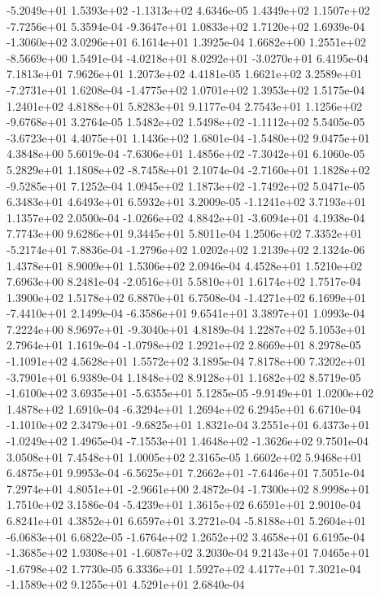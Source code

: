-5.2049e+01  1.5393e+02 -1.1313e+02  4.6346e-05
 1.4349e+02  1.1507e+02 -7.7256e+01  5.3594e-04
-9.3647e+01  1.0833e+02  1.7120e+02  1.6939e-04
-1.3060e+02  3.0296e+01  6.1614e+01  1.3925e-04
 1.6682e+00  1.2551e+02 -8.5669e+00  1.5491e-04
-4.0218e+01  8.0292e+01 -3.0270e+01  6.4195e-04
7.1813e+01 7.9626e+01 1.2073e+02  4.4181e-05
 1.6621e+02  3.2589e+01 -7.2731e+01  1.6208e-04
-1.4775e+02  1.0701e+02  1.3953e+02  1.5175e-04
1.2401e+02 4.8188e+01 5.8283e+01  9.1177e-04
 2.7543e+01  1.1256e+02 -9.6768e+01  3.2764e-05
 1.5482e+02  1.5498e+02 -1.1112e+02  5.5405e-05
-3.6723e+01  4.4075e+01  1.1436e+02  1.6801e-04
-1.5480e+02  9.0475e+01  4.3848e+00  5.6019e-04
-7.6306e+01  1.4856e+02 -7.3042e+01  6.1060e-05
 5.2829e+01  1.1808e+02 -8.7458e+01  2.1074e-04
-2.7160e+01  1.1828e+02 -9.5285e+01  7.1252e-04
 1.0945e+02  1.1873e+02 -1.7492e+02  5.0471e-05
6.3483e+01 4.6493e+01 6.5932e+01  3.2009e-05
-1.1241e+02  3.7193e+01  1.1357e+02  2.0500e-04
-1.0266e+02  4.8842e+01 -3.6094e+01  4.1938e-04
7.7743e+00 9.6286e+01 9.3445e+01  5.8011e-04
 1.2506e+02  7.3352e+01 -5.2174e+01  7.8836e-04
-1.2796e+02  1.0202e+02  1.2139e+02  2.1324e-06
1.4378e+01 8.9009e+01 1.5306e+02  2.0946e-04
4.4528e+01 1.5210e+02 7.6963e+00  8.2481e-04
-2.0516e+01  5.5810e+01  1.6174e+02  1.7517e-04
1.3900e+02 1.5178e+02 6.8870e+01  6.7508e-04
-1.4271e+02  6.1699e+01 -7.4410e+01  2.1499e-04
-6.3586e+01  9.6541e+01  3.3897e+01  1.0993e-04
 7.2224e+00  8.9697e+01 -9.3040e+01  4.8189e-04
1.2287e+02 5.1053e+01 2.7964e+01  1.1619e-04
-1.0798e+02  1.2921e+02  2.8669e+01  8.2978e-05
-1.1091e+02  4.5628e+01  1.5572e+02  3.1895e-04
 7.8178e+00  7.3202e+01 -3.7901e+01  6.9389e-04
1.1848e+02 8.9128e+01 1.1682e+02  8.5719e-05
-1.6100e+02  3.6935e+01 -5.6355e+01  5.1285e-05
-9.9149e+01  1.0200e+02  1.4878e+02  1.6910e-04
-6.3294e+01  1.2694e+02  6.2945e+01  6.6710e-04
-1.1010e+02  2.3479e+01 -9.6825e+01  1.8321e-04
 3.2551e+01  6.4373e+01 -1.0249e+02  1.4965e-04
-7.1553e+01  1.4648e+02 -1.3626e+02  9.7501e-04
3.0508e+01 7.4548e+01 1.0005e+02  2.3165e-05
1.6602e+02 5.9468e+01 6.4875e+01  9.9953e-04
-6.5625e+01  7.2662e+01 -7.6446e+01  7.5051e-04
 7.2974e+01  4.8051e+01 -2.9661e+00  2.4872e-04
-1.7300e+02  8.9998e+01  1.7510e+02  3.1586e-04
-5.4239e+01  1.3615e+02  6.6591e+01  2.9010e-04
6.8241e+01 4.3852e+01 6.6597e+01  3.2721e-04
-5.8188e+01  5.2604e+01 -6.0683e+01  6.6822e-05
-1.6764e+02  1.2652e+02  3.4658e+01  6.6195e-04
-1.3685e+02  1.9308e+01 -1.6087e+02  3.2030e-04
 9.2143e+01  7.0465e+01 -1.6798e+02  1.7730e-05
6.3336e+01 1.5927e+02 4.4177e+01  7.3021e-04
-1.1589e+02  9.1255e+01  4.5291e+01  2.6840e-04
